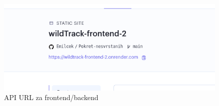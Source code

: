 			\begin{figure}[H]
				\centering
				\includegraphics[width=\textwidth]{slike/slika10.PNG}
				\caption{API URL za frontend/backend}
				\label{fig:dijagram_baze}
			\end{figure}
		
		